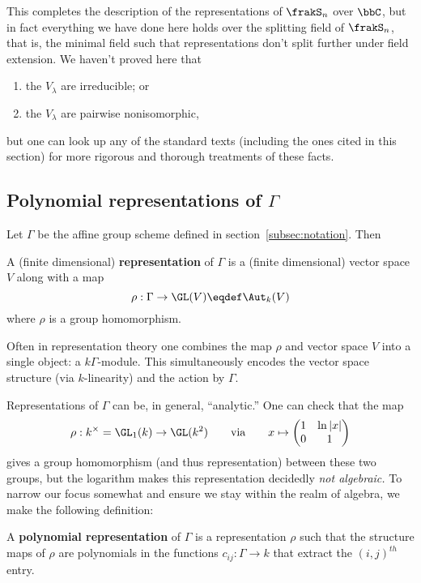 \documentclass[12pt]{article}
\begin{document}
This completes the description of the representations of $\frakS_n$ over $\bbC$, but in fact everything we have done here holds over the splitting field 
of $\frakS_n$, that is, the minimal field such that representations don't split further under field extension. We haven't proved here that
\begin{enumerate}
	\item the $V_\lambda$ are irreducible; or 
	\item the $V_\lambda$ are pairwise nonisomorphic,
\end{enumerate}
but one can look up any of the standard texts (including the ones cited in this section) for more rigorous and thorough treatments of these facts.

\subsection{Polynomial representations of \texorpdfstring{$\Gamma$}{Gamma}}
Let $\Gamma$ be the affine group scheme defined in section~\ref{subsec:notation}. Then 
\begin{defn}
	A (finite dimensional) \textbf{representation} of $\Gamma$ is a (finite dimensional) vector space $V$ along with a map
	\[\rho:\Gamma\to \GL(V)\eqdef\Aut_k(V)\]
	where $\rho$ is a group homomorphism.
\end{defn}
\begin{rmk}
	Often in representation theory one combines the map $\rho$ and vector space $V$ into a single object:
	a $k\Gamma$-module. This simultaneously encodes the vector space structure (via $k$-linearity) and the action by 
	$\Gamma$.
\end{rmk}
Representations of $\Gamma$ can be, in general, ``analytic.'' One can check that the map 
\[\rho:k^\times=\GL_1(k)\to \GL(k^2)\qquad\text{via}\qquad x\mapsto\begin{pmatrix}
	1 & \ln |x|\\ 0 & 1
\end{pmatrix}\]
gives a group homomorphism (and thus representation) between these two groups, but the logarithm makes this representation decidedly \textit{not algebraic.}
To narrow our focus somewhat and ensure we stay within the realm of algebra, we make the following definition:
\begin{defn}\label{def:poly-rep}
	A \textbf{polynomial representation} of $\Gamma$ is a representation $\rho$ such that the structure maps of $\rho$ 
	are polynomials in the functions $c_{ij}:\Gamma\to k$ that extract the $(i,j)^{th}$ entry.
\end{defn}
\end{document}

